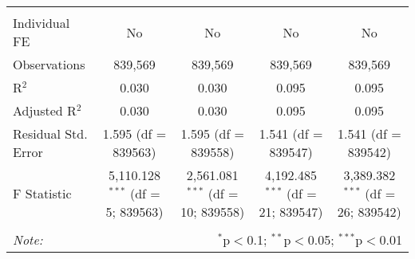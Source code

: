 \documentclass[
]{article}
\begin{document}
\begin{table}[!htbp]
{\begin{tabular}{@{\extracolsep{5pt}}lcccc}
\hline \\[-1.8ex] 
Individual FE & No & No & No & No \\ 
Observations & 839,569 & 839,569 & 839,569 & 839,569 \\ 
R$^{2}$ & 0.030 & 0.030 & 0.095 & 0.095 \\ 
Adjusted R$^{2}$ & 0.030 & 0.030 & 0.095 & 0.095 \\ 
Residual Std. Error & 1.595 (df = 839563) & 1.595 (df = 839558) & 1.541 (df = 839547) & 1.541 (df = 839542) \\ 
F Statistic & 5,110.128$^{***}$ (df = 5; 839563) & 2,561.081$^{***}$ (df = 10; 839558) & 4,192.485$^{***}$ (df = 21; 839547) & 3,389.382$^{***}$ (df = 26; 839542) \\ 
\hline 
\hline \\[-1.8ex] 
\textit{Note:}  & \multicolumn{4}{r}{$^{*}$p$<$0.1; $^{**}$p$<$0.05; $^{***}$p$<$0.01} \\ 
\end{tabular}
} 
\end{table} 
\newpage
\end{document}
